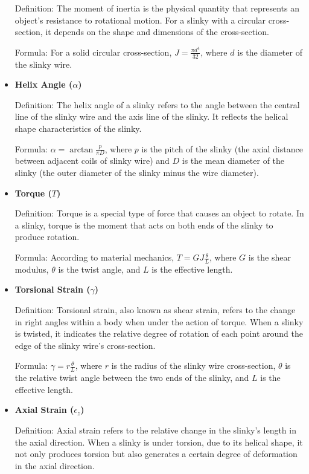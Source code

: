 \documentclass{mcmthesis}  %
\begin{document}
\begin{appendices}
\begin{itemize}
    Definition: The moment of inertia is the physical quantity that represents an object's resistance to rotational motion. For a slinky with a circular cross-section, it depends on the shape and dimensions of the cross-section.
    
    Formula: For a solid circular cross-section, $J = \frac{\pi d^4}{32}$, where $d$ is the diameter of the slinky wire.

    \item \textbf{Helix Angle ($\alpha$)}
    
    Definition: The helix angle of a slinky refers to the angle between the central line of the slinky wire and the axis line of the slinky. It reflects the helical shape characteristics of the slinky.
    
    Formula: $\alpha = \arctan \frac{p}{\pi D}$, where $p$ is the pitch of the slinky (the axial distance between adjacent coils of slinky wire) and $D$ is the mean diameter of the slinky (the outer diameter of the slinky minus the wire diameter).

    \item \textbf{Torque ($T$)}
    
    Definition: Torque is a special type of force that causes an object to rotate. In a slinky, torque is the moment that acts on both ends of the slinky to produce rotation.
    
    Formula: According to material mechanics, $T = GJ\frac{\theta}{L}$, where $G$ is the shear modulus, $\theta$ is the twist angle, and $L$ is the effective length.

    \item \textbf{Torsional Strain ($\gamma$)}
    
    Definition: Torsional strain, also known as shear strain, refers to the change in right angles within a body when under the action of torque. When a slinky is twisted, it indicates the relative degree of rotation of each point around the edge of the slinky wire's cross-section.
    
    Formula: $\gamma = r\frac{\theta}{L}$, where $r$ is the radius of the slinky wire cross-section, $\theta$ is the relative twist angle between the two ends of the slinky, and $L$ is the effective length.

    \item \textbf{Axial Strain ($\epsilon_z$)}
    
    Definition: Axial strain refers to the relative change in the slinky's length in the axial direction. When a slinky is under torsion, due to its helical shape, it not only produces torsion but also generates a certain degree of deformation in the axial direction.
    

\end{itemize}
\end{appendices}
\end{document}
